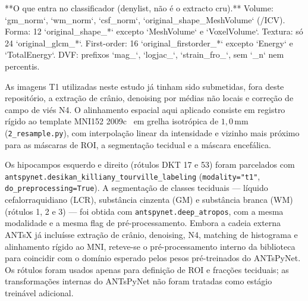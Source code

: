 \documentclass[review]{elsarticle}
\newcommand{\code}[1]{\texttt{#1}}
\begin{document}
	**O que entra no classificador (denylist, não é o extracto cru).** Volume: `gm\_norm`, `wm\_norm`, `csf\_norm`, `original\_shape\_MeshVolume` (/ICV). Forma: 12 `original\_shape\_*` excepto `MeshVolume` e `VoxelVolume`. Textura: só 24 `original\_glcm\_*`. First-order: 16 `original\_firstorder\_*` excepto `Energy` e `TotalEnergy`. DVF: prefixos `mag\_`, `logjac\_`, `strain\_fro\_`, sem `\_n` nem percentis.
	
	
	
	As imagens T1 utilizadas neste estudo já tinham sido submetidas, fora deste repositório, a extração de crânio, denoising por médias não locais e correção de campo de viés N4.
	O alinhamento espacial aqui aplicado consiste em registro rígido ao template MNI152 2009c~\cite{fonov-2011} em grelha isotrópica de $1{,}0$\,mm (\code{2\_resample.py}), com interpolação linear da intensidade e vizinho mais próximo para as máscaras de ROI, a segmentação tecidual e a máscara encefálica.
	
	
	Os hipocampos esquerdo e direito (rótulos DKT 17 e 53) foram parcelados com \code{antspynet.desikan\_killiany\_tourville\_labeling} (\code{modality="t1"}, \code{do\_preprocessing=True}). A segmentação de classes teciduais --- líquido cefalorraquidiano (LCR), substância cinzenta (GM) e substância branca (WM) (rótulos 1, 2 e 3) --- foi obtida com \code{antspynet.deep\_atropos}, com a mesma modalidade e a mesma flag de pré-processamento.
	Embora a cadeia externa ANTsX já incluísse extração de crânio, denoising, N4, matching de histograma e alinhamento rígido ao MNI, reteve-se o pré-processamento interno da biblioteca para coincidir com o domínio esperado pelos pesos pré-treinados do ANTsPyNet. Os rótulos foram usados apenas para definição de ROI e fracções teciduais; as transformações internas do ANTsPyNet não foram tratadas como estágio treinável adicional.
\end{document}
